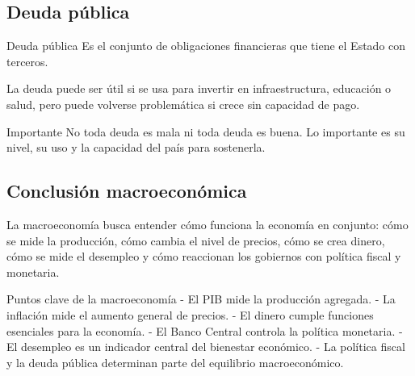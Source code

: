 \subsection{Deuda pública}

\begin{concepto}{Deuda pública}
Es el conjunto de obligaciones financieras que tiene el Estado con terceros.
\end{concepto}

La deuda puede ser útil si se usa para invertir en infraestructura, educación o salud, pero puede volverse problemática si crece sin capacidad de pago.

\begin{advertencia}{Importante}
No toda deuda es mala ni toda deuda es buena. Lo importante es su nivel, su uso y la capacidad del país para sostenerla.
\end{advertencia}

\subsection{Conclusión macroeconómica}

La macroeconomía busca entender cómo funciona la economía en conjunto: cómo se mide la producción, cómo cambia el nivel de precios, cómo se crea dinero, cómo se mide el desempleo y cómo reaccionan los gobiernos con política fiscal y monetaria.

\begin{resumen}{Puntos clave de la macroeconomía}
- El PIB mide la producción agregada.
- La inflación mide el aumento general de precios.
- El dinero cumple funciones esenciales para la economía.
- El Banco Central controla la política monetaria.
- El desempleo es un indicador central del bienestar económico.
- La política fiscal y la deuda pública determinan parte del equilibrio macroeconómico.
\end{resumen}
